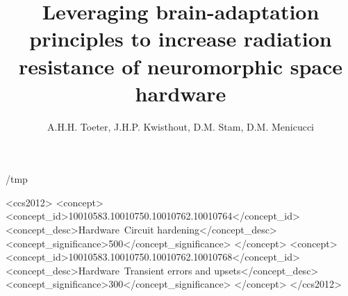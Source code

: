 \documentclass[sigconf]{acmart}
\def\overleafhome{/tmp}%
\begin{document}
\title{Leveraging brain-adaptation principles to increase radiation resistance of neuromorphic space hardware
}

\author{A.H.H. Toeter, J.H.P. Kwisthout, D.M. Stam, D.M. Menicucci}
%
%
%
%

\renewcommand{\shortauthors}{Toeter et al.}

\ifx\homepath\overleafhome
  
\else
  
\fi


\begin{CCSXML}
  <ccs2012>
    <concept>
        <concept_id>10010583.10010750.10010762.10010764</concept_id>
        <concept_desc>Hardware~Circuit hardening</concept_desc>
        <concept_significance>500</concept_significance>
        </concept>
    <concept>
        <concept_id>10010583.10010750.10010762.10010768</concept_id>
        <concept_desc>Hardware~Transient errors and upsets</concept_desc>
        <concept_significance>300</concept_significance>
        </concept>
  </ccs2012>
\end{CCSXML}
\end{document}
